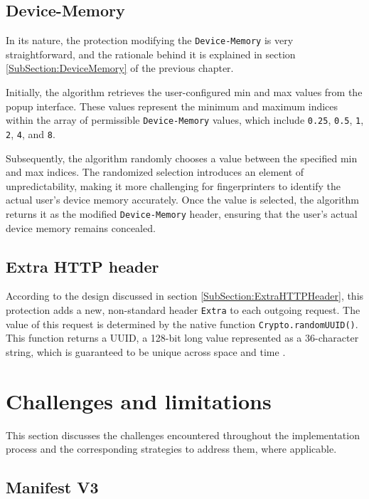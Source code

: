 \subsection{Device-Memory}

In its nature, the protection modifying the \texttt{Device-Memory} is very straightforward, and the rationale behind it is explained in section \ref{SubSection:DeviceMemory} of the previous chapter.

Initially, the algorithm retrieves the user-configured min and max values from the popup interface. These values represent the minimum and maximum indices within the array of permissible \texttt{Device-Memory} values, which include \texttt{0.25}, \texttt{0.5}, \texttt{1}, \texttt{2}, \texttt{4}, and \texttt{8}.

Subsequently, the algorithm randomly chooses a value between the specified min and max indices. The randomized selection introduces an element of unpredictability, making it more challenging for fingerprinters to identify the actual user's device memory accurately. Once the value is selected, the algorithm returns it as the modified \texttt{Device-Memory} header, ensuring that the user's actual device memory remains concealed.

\subsection{Extra HTTP header}

According to the design discussed in section \ref{SubSection:ExtraHTTPHeader}, this protection adds a new, non-standard header \texttt{Extra} to each outgoing request. The value of this request is determined by the native function \texttt{Crypto.randomUUID()}. This function returns a UUID, a 128-bit long value represented as a 36-character string, which is guaranteed to be unique across space and time \cite{RFC4122}.

\section{Challenges and limitations}

This section discusses the challenges encountered throughout the implementation process and the corresponding strategies to address them, where applicable.

\subsection{Manifest V3}

